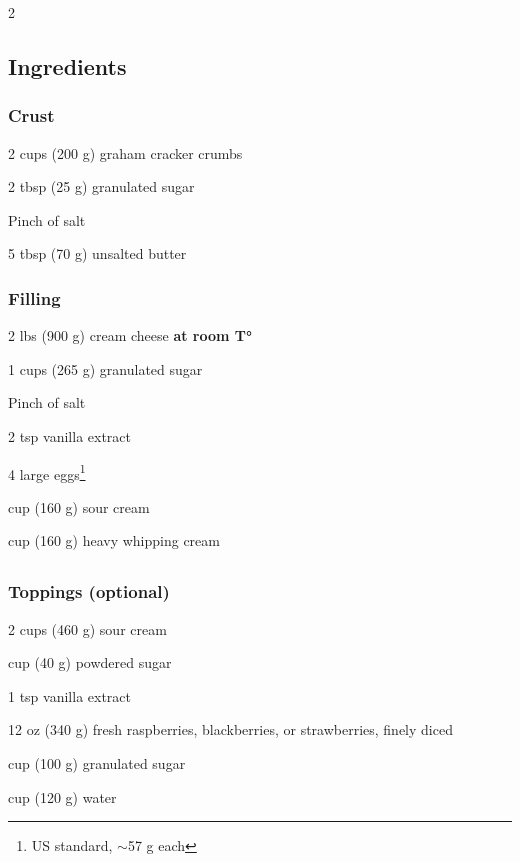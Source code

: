 \newpage
{}

\begin{multicols}{2}
	\subsection*{Ingredients}
	
	\subsubsection*{Crust}
	\begin{ingredients}
		\item 2 cups (200 g) graham cracker crumbs
		\item 2 tbsp (25 g) granulated sugar
		\item Pinch of salt
		\item 5 tbsp (70 g) unsalted butter
	\end{ingredients}
	
	\subsubsection*{Filling}
	\begin{ingredients}
		\item 2 lbs (900 g) cream cheese \textbf{at room T°}
		\item 1 cups (265 g) granulated sugar
		\item Pinch of salt
		\item 2 tsp vanilla extract
		\item 4 large eggs\footnote{US standard, $\sim$57 g each}
		\item {} cup (160 g) sour cream
		\item {} cup (160 g) heavy whipping cream
	\end{ingredients}
	\columnbreak
	\subsection*{ }
	\subsubsection*{Toppings \normalfont(optional)}
	\begin{ingredients}
	\item 2 cups (460 g) sour cream
	\item {} cup (40 g) powdered sugar
	\item 1 tsp vanilla extract
	\item 12 oz (340 g) fresh raspberries, blackberries, or strawberries, finely diced
	\item {} cup (100 g) granulated sugar
	\item {} cup (120 g) water
	\end{ingredients}


\end{multicols}
